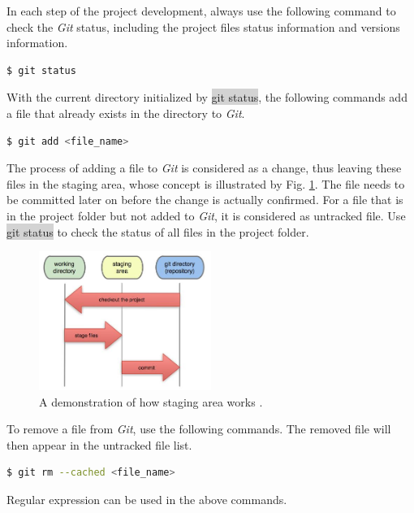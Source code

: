 \documentclass[a4paper]{article}
\begin{document}
In each step of the project development, always use the following command to check the \textit{Git} status, including the project files status information and versions information.
\begin{lstlisting}[backgroundcolor = \color{lightgray},language=bash]
  $ git status
\end{lstlisting}

With the current directory initialized by \colorbox{lightgray}{git status}, the following commands add a file that already exists in the directory to \textit{Git}.
\begin{lstlisting}[backgroundcolor = \color{lightgray},language=bash]
  $ git add <file_name>
\end{lstlisting}

The process of adding a file to \textit{Git} is considered as a change, thus leaving these files in the staging area, whose concept is illustrated by Fig. \ref{fig:StagingArea}. The file needs to be committed later on before the change is actually confirmed. For a file that is in the project folder but not added to \textit{Git}, it is considered as untracked file. Use \colorbox{lightgray}{git status} to check the status of all files in the project folder.
\begin{figure}[htbp]
    \centering
    \includegraphics[width=0.5\textwidth]{figStagingArea.jpg}
    \caption{A demonstration of how staging area works \cite{stackexchangeStagingArea}. }
    \label{fig:StagingArea}
\end{figure}

To remove a file from \textit{Git}, use the following commands. The removed file will then appear in the untracked file list.
\begin{lstlisting}[backgroundcolor = \color{lightgray},language=bash]
  $ git rm --cached <file_name>
\end{lstlisting}

Regular expression can be used in the above commands.
\end{document}
